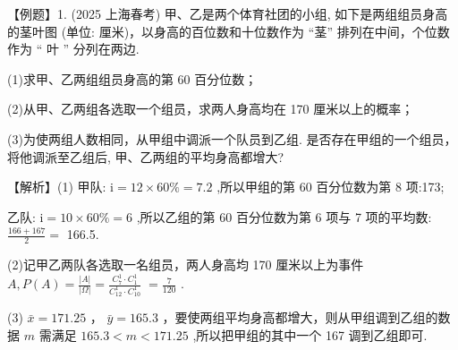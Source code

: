 \documentclass[10pt]{article}
\begin{document}
【例题】1. (2025 上海春考) 甲、乙是两个体育社团的小组, 如下是两组组员身高的茎叶图 (单位: 厘米)，以身高的百位数和十位数作为 “茎” 排列在中间，个位数作为 “ 叶 ” 分列在两边.

(1)求甲、乙两组组员身高的第 60 百分位数；

(2)从甲、乙两组各选取一个组员，求两人身高均在 170 厘米以上的概率；

(3)为使两组人数相同，从甲组中调派一个队员到乙组. 是否存在甲组的一个组员，将他调派至乙组后, 甲、乙两组的平均身高都增大?

\begin{center}
\end{center}

【解析】(1) 甲队: \(\mathrm{i} = {12} \times  {60}\%  = {7.2}\) ,所以甲组的第 60 百分位数为第 8 项:173;

乙队: \(\mathrm{i} = {10} \times  {60}\%  = 6\) ,所以乙组的第 60 百分位数为第 6 项与 7 项的平均数: \(\frac{{166} + {167}}{2} =\) 166.5.

(2)记甲乙两队各选取一名组员，两人身高均 170 厘米以上为事件 \(A,P\left( A\right)  = \frac{\left| A\right| }{\left| \Omega \right| } = \frac{{C}_{7}^{1} \cdot  {C}_{1}^{1}}{{C}_{12}^{1} \cdot  {C}_{10}^{1}} \; = \frac{7}{120}\) .

(3) \(\bar{x} = {171.25}\) ， \(\bar{y} = {165.3}\) ，要使两组平均身高都增大，则从甲组调到乙组的数据 \(m\) 需满足 \({165.3} < m < {171.25}\) ,所以把甲组的其中一个 167 调到乙组即可.
\end{document}
